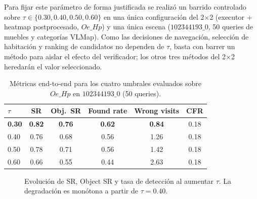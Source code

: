 \documentclass[11pt,a4paper]{article}
\begin{document}
Para fijar este parámetro de forma justificada se realizó un barrido
controlado sobre $\tau \in \{0.30, 0.40, 0.50, 0.60\}$ en una única configuración
del 2$\times$2 (executor + heatmap postprocesado, $Oe\_Hp$) y una única escena
($102344193\_0$, 50 queries de muebles y categorías VLMap). Como las decisiones
de navegación, selección de habitación y ranking de candidatos no dependen de
$\tau$, basta con barrer un método para aislar el efecto del verificador; los
otros tres métodos del 2$\times$2 heredarán el valor seleccionado.

\begin{table}[h]
\centering
\small
\begin{tabular}{lccccc}
\toprule
$\tau$ & SR & Obj.\ SR & Found rate & Wrong visits & CFR \\
\midrule
\textbf{0.30} & \textbf{0.82} & \textbf{0.76} & \textbf{0.62} & \textbf{0.84} & 0.18 \\
0.40 & 0.76 & 0.68 & 0.56 & 1.26 & 0.18 \\
0.50 & 0.78 & 0.71 & 0.56 & 1.42 & 0.18 \\
0.60 & 0.66 & 0.55 & 0.44 & 2.63 & 0.18 \\
\bottomrule
\end{tabular}
\caption{Métricas end-to-end para los cuatro umbrales evaluados sobre $Oe\_Hp$
en $102344193\_0$ (50 queries).}
\label{tab:yoloe-thresh}
\end{table}

\begin{figure}[h]
\centering
{}
\caption{Evolución de SR, Object SR y tasa de detección al aumentar $\tau$.
La degradación es monótona a partir de $\tau=0.40$.}
\label{fig:yoloe-thresh-rates}
\end{figure}
\end{document}
